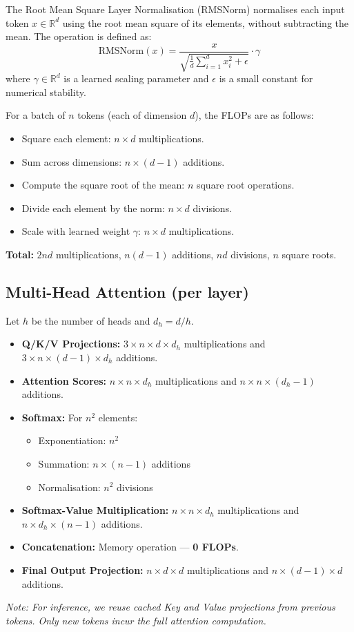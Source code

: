 \documentclass[a4paper,12pt]{article}
\begin{document}
The Root Mean Square Layer Normalisation (RMSNorm) \citep{zhang2019root} normalises each input token $x \in \mathbb{R}^d$ using the root mean square of its elements, without subtracting the mean. The operation is defined as:
\begin{equation}
\text{RMSNorm}(x) = \frac{x}{\sqrt{\frac{1}{d} \sum_{i=1}^{d} x_i^2 + \epsilon}} \cdot \gamma
\end{equation}
where $\gamma \in \mathbb{R}^d$ is a learned scaling parameter and $\epsilon$ is a small constant for numerical stability.

For a batch of $n$ tokens (each of dimension $d$), the FLOPs are as follows:
\begin{itemize}
  \item Square each element: $n \times d$ multiplications.
  \item Sum across dimensions: $n \times (d - 1)$ additions.
  \item Compute the square root of the mean: $n$ square root operations.
  \item Divide each element by the norm: $n \times d$ divisions.
  \item Scale with learned weight $\gamma$: $n \times d$ multiplications.
\end{itemize}

\textbf{Total:} $2nd$ multiplications, $n(d - 1)$ additions, $nd$ divisions, $n$ square roots.


\subsection*{Multi-Head Attention (per layer)}
Let $h$ be the number of heads and $d_h = d / h$.
\begin{itemize}
  \item \textbf{Q/K/V Projections:} $3 \times n \times d \times d_h$ multiplications and $3 \times n \times (d - 1) \times d_h$ additions.
  \item \textbf{Attention Scores:} $n \times n \times d_h$ multiplications and $n \times n \times (d_h - 1)$ additions.
  \item \textbf{Softmax:} For $n^2$ elements:
    \begin{itemize}
      \item Exponentiation: $n^2$
      \item Summation: $n \times (n - 1)$ additions
      \item Normalisation: $n^2$ divisions
    \end{itemize}
  \item \textbf{Softmax-Value Multiplication:} $n \times n \times d_h$ multiplications and $n \times d_h \times (n - 1)$ additions.
  \item \textbf{Concatenation:} Memory operation — \textbf{0 FLOPs}.
  \item \textbf{Final Output Projection:} $n \times d \times d$ multiplications and $n \times (d - 1) \times d$ additions.
\end{itemize}
\textit{Note: For inference, we reuse cached Key and Value projections from previous tokens. Only new tokens incur the full attention computation.}
\end{document}
